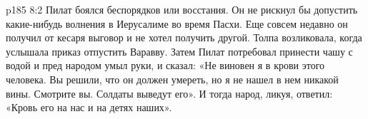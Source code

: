 \vs p185 8:2 \pc Пилат боялся беспорядков или восстания. Он не рискнул бы допустить какие\hyp{}нибудь волнения в Иерусалиме во время Пасхи. Еще совсем недавно он получил от кесаря выговор и не хотел получить другой. Толпа возликовала, когда услышала приказ отпустить Варавву. Затем Пилат потребовал принести чашу с водой и пред народом умыл руки, и сказал: «Не виновен я в крови этого человека. Вы решили, что он должен умереть, но я не нашел в нем никакой вины. Смотрите вы. Солдаты выведут его». И тогда народ, ликуя, ответил: «Кровь его на нас и на детях наших».
